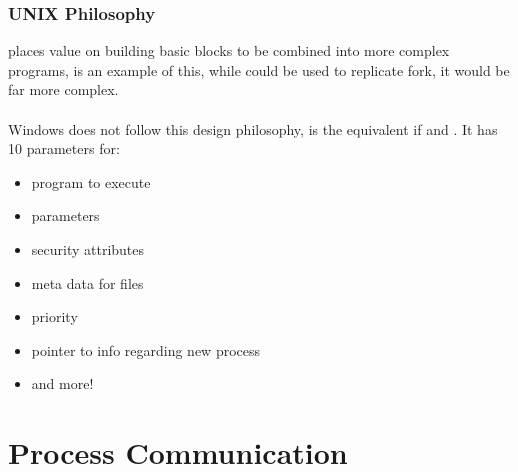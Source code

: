 \documentclass{report}
\begin{document}
\subsubsection*{UNIX Philosophy}
 places value on building basic blocks to be combined into more complex programs,  is an example of this, while  could be used to replicate fork, it would be far more complex.
\\
\\ Windows does not follow this design philosophy,  is the equivalent if  and . It has 10 parameters for:
\begin{itemize}
	\item program to execute
	\item parameters
	\item security attributes
	\item meta data for files
	\item priority
	\item pointer to info regarding new process
	\item and more!
\end{itemize}

\section*{Process Communication}
\end{document}
